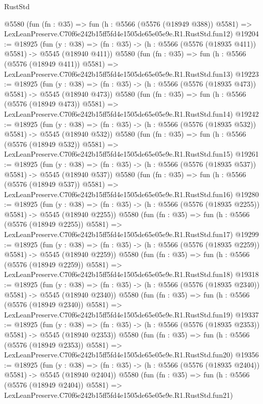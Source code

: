 \begin{lexlean}{RustStd}
\begin{coremodule}
    @5580
    (fun (fn : @35) =>
    fun (h : @5566 (@5576 (@18949 @388)) @5581) =>
    LexLeanPreserve.C70f6e242b15ff5fd4e1505de65e05e9e.R1.RustStd.fun12)
@19204 := @18925
    (fun (y : @38) => (fn : @35) -> (h : @5566 (@5576 (@18935 @411)) @5581) -> @5545 (@18940 @411))
    @5580
    (fun (fn : @35) =>
    fun (h : @5566 (@5576 (@18949 @411)) @5581) =>
    LexLeanPreserve.C70f6e242b15ff5fd4e1505de65e05e9e.R1.RustStd.fun13)
@19223 := @18925
    (fun (y : @38) => (fn : @35) -> (h : @5566 (@5576 (@18935 @473)) @5581) -> @5545 (@18940 @473))
    @5580
    (fun (fn : @35) =>
    fun (h : @5566 (@5576 (@18949 @473)) @5581) =>
    LexLeanPreserve.C70f6e242b15ff5fd4e1505de65e05e9e.R1.RustStd.fun14)
@19242 := @18925
    (fun (y : @38) => (fn : @35) -> (h : @5566 (@5576 (@18935 @532)) @5581) -> @5545 (@18940 @532))
    @5580
    (fun (fn : @35) =>
    fun (h : @5566 (@5576 (@18949 @532)) @5581) =>
    LexLeanPreserve.C70f6e242b15ff5fd4e1505de65e05e9e.R1.RustStd.fun15)
@19261 := @18925
    (fun (y : @38) => (fn : @35) -> (h : @5566 (@5576 (@18935 @537)) @5581) -> @5545 (@18940 @537))
    @5580
    (fun (fn : @35) =>
    fun (h : @5566 (@5576 (@18949 @537)) @5581) =>
    LexLeanPreserve.C70f6e242b15ff5fd4e1505de65e05e9e.R1.RustStd.fun16)
@19280 := @18925
    (fun (y : @38) =>
    (fn : @35) -> (h : @5566 (@5576 (@18935 @2255)) @5581) -> @5545 (@18940 @2255))
    @5580
    (fun (fn : @35) =>
    fun (h : @5566 (@5576 (@18949 @2255)) @5581) =>
    LexLeanPreserve.C70f6e242b15ff5fd4e1505de65e05e9e.R1.RustStd.fun17)
@19299 := @18925
    (fun (y : @38) =>
    (fn : @35) -> (h : @5566 (@5576 (@18935 @2259)) @5581) -> @5545 (@18940 @2259))
    @5580
    (fun (fn : @35) =>
    fun (h : @5566 (@5576 (@18949 @2259)) @5581) =>
    LexLeanPreserve.C70f6e242b15ff5fd4e1505de65e05e9e.R1.RustStd.fun18)
@19318 := @18925
    (fun (y : @38) =>
    (fn : @35) -> (h : @5566 (@5576 (@18935 @2340)) @5581) -> @5545 (@18940 @2340))
    @5580
    (fun (fn : @35) =>
    fun (h : @5566 (@5576 (@18949 @2340)) @5581) =>
    LexLeanPreserve.C70f6e242b15ff5fd4e1505de65e05e9e.R1.RustStd.fun19)
@19337 := @18925
    (fun (y : @38) =>
    (fn : @35) -> (h : @5566 (@5576 (@18935 @2353)) @5581) -> @5545 (@18940 @2353))
    @5580
    (fun (fn : @35) =>
    fun (h : @5566 (@5576 (@18949 @2353)) @5581) =>
    LexLeanPreserve.C70f6e242b15ff5fd4e1505de65e05e9e.R1.RustStd.fun20)
@19356 := @18925
    (fun (y : @38) =>
    (fn : @35) -> (h : @5566 (@5576 (@18935 @2404)) @5581) -> @5545 (@18940 @2404))
    @5580
    (fun (fn : @35) =>
    fun (h : @5566 (@5576 (@18949 @2404)) @5581) =>
    LexLeanPreserve.C70f6e242b15ff5fd4e1505de65e05e9e.R1.RustStd.fun21)

\end{coremodule}
\end{lexlean}
